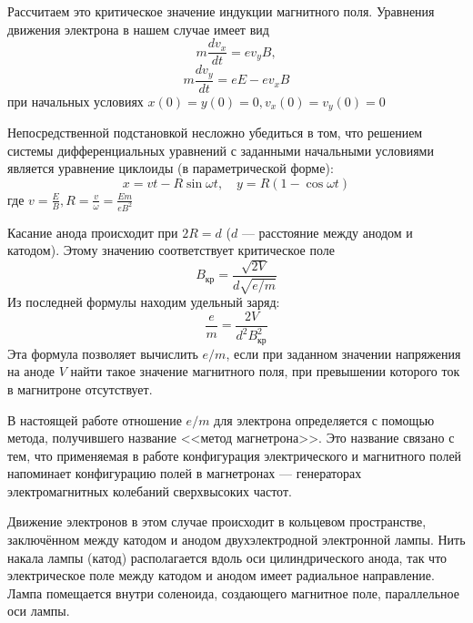 \documentclass[a4paper, 12pt]{article}
\begin{document}
Рассчитаем это критическое значение индукции магнитного поля. Уравнения движения электрона в нашем случае имеет вид
\begin{equation}
	m \frac{d v_x}{d t} = e v_y B,
\end{equation}
\begin{equation}
	m \frac{d v_y}{d t} = e E - e v_x B
\end{equation}
при начальных условиях $x(0) = y(0) = 0, v_x(0) = v_y (0) = 0$

Непосредственной подстановкой несложно убедиться в том, что решением системы дифференциальных уравнений с заданными начальными условиями является уравнение циклоиды (в параметрической форме):
\begin{equation}
	x = v t - R \sin \omega t, \quad y = R(1 - \cos \omega t)
\end{equation}
где $v = \frac{E}{B}, R = \frac{v}{\omega} = \frac{E m}{e B^2}$

Касание анода происходит при $2R = d$ ($d$ --- расстояние между анодом и катодом). Этому значению соответствует критическое поле
\begin{equation}
	B_\text{кр} = \frac{\sqrt{2V}}{d \sqrt{e / m}}
\end{equation}
Из последней формулы находим удельный заряд:
\begin{equation}
	\frac{e}{m} = \frac{2V}{d^2 B_\text{кр}^2}
\end{equation}
Эта формула позволяет вычислить $e / m$, если при заданном значении напряжения на аноде $V$ найти такое значение магнитного поля, при превышении которого ток в магнитроне отсутствует.

В настоящей работе отношение $e / m$ для электрона определяется с помощью метода, получившего название <<метод магнетрона>>. Это название связано с тем, что применяемая в работе конфигурация электрического и магнитного полей напоминает конфигурацию полей в магнетронах --- генераторах электромагнитных колебаний сверхвысоких частот.

Движение электронов в этом случае происходит в кольцевом пространстве, заключённом между катодом и анодом двухэлектродной электронной лампы. Нить накала лампы (катод) располагается вдоль оси цилиндрического анода, так что электрическое поле между катодом и анодом имеет радиальное направление. Лампа помещается внутри соленоида, создающего магнитное поле, параллельное оси лампы.
\end{document}
